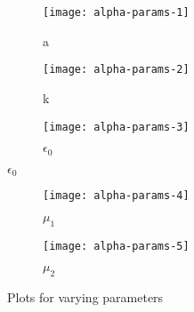 \begin{figure}[b]
    \centering
    \begin{subfigure}[b]{\textwidth}
        \texttt{[image: alpha-params-1]}
        \vspace{-2\baselineskip}
        \caption{a}
    \end{subfigure}
    \begin{subfigure}[b]{\textwidth}
        \texttt{[image: alpha-params-2]}
        \vspace{-2\baselineskip}
        \caption{k}
    \end{subfigure}
    \begin{subfigure}[b]{\textwidth}
        \texttt{[image: alpha-params-3]}
        \vspace{-2\baselineskip}
        \caption{$\epsilon_0$}
    \end{subfigure}
\end{figure}
\begin{figure}[t]
    \ContinuedFloat
    \centering
    \begin{subfigure}[b]{\textwidth}
        \texttt{[image: alpha-params-4]}
        \vspace{-2\baselineskip}
        \caption{$\mu_1$}
    \end{subfigure}
    \begin{subfigure}[b]{\textwidth}
        \texttt{[image: alpha-params-5]}
        \vspace{-2\baselineskip}
        \caption{$\mu_2$}
    \end{subfigure}
    \caption{Plots for varying parameters}
    \label{app:apparams}
\end{figure}


